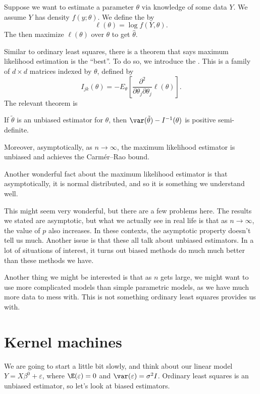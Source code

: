 \documentclass[a4paper]{article}
\begin{document}
Suppose we want to estimate a parameter $\theta$ via knowledge of some data $Y$. We assume $Y$ has density $f(y; \theta)$. We define the  by
\[
  \ell(\theta) = \log f(Y, \theta).
\]
The  then maximize $\ell(\theta)$ over $\theta$ to get $\hat{\theta}$.

Similar to ordinary least squares, there is a theorem that says maximum likelihood estimation is the ``best''. To do so, we introduce the . This is a family of $d \times d$ matrices indexed by $\theta$, defined by
\[
  I_{jk}(\theta) = - E_\theta\left[\frac{\partial^2}{\partial \theta_j \partial \theta_j} \ell(\theta)\right].
\]
The relevant theorem is
\begin{thm}
  If $\tilde{\theta}$ is an unbiased estimator for $\theta$, then $\var(\tilde{\theta}) - I^{-1}(\theta)$ is positive semi-definite.

  Moreover, asymptotically, as $n \to \infty$, the maximum likelihood estimator is unbiased and achieves the Carm\'er--Rao bound.
\end{thm}

Another wonderful fact about the maximum likelihood estimator is that asymptotically, it is normal distributed, and so it is something we understand well.

This might seem very wonderful, but there are a few problems here. The results we stated are asymptotic, but what we actually see in real life is that as $n \to \infty$, the value of $p$ also increases. In these contexts, the asymptotic property doesn't tell us much. Another issue is that these all talk about unbiased estimators. In a lot of situations of interest, it turns out biased methods do much much better than these methods we have.

Another thing we might be interested is that as $n$ gets large, we might want to use more complicated models than simple parametric models, as we have much more data to mess with. This is not something ordinary least squares provides us with.

\section{Kernel machines}
We are going to start a little bit slowly, and think about our linear model $Y = X\beta^0 + \varepsilon$, where $\E(\varepsilon) = 0$ and $\var(\varepsilon) = \sigma^2 I$. Ordinary least squares is an unbiased estimator, so let's look at biased estimators.
\end{document}
